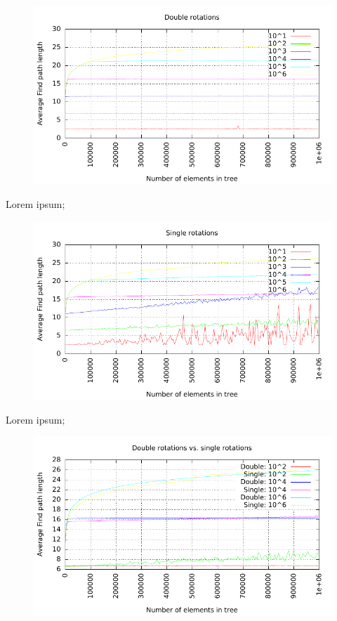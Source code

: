 \documentclass[12pt,a4paper]{report}
\begin{document}
	
	\begin{figure}[h]	
		\centering	
		\includegraphics[scale=0.75]{graph_1}		
	\end{figure}

Lorem ipsum;

	\begin{figure}[h]	
		\centering	
		\includegraphics[scale=0.75]{graph_2}		
	\end{figure}

Lorem ipsum;

	\begin{figure}[h]	
		\centering	
		\includegraphics[scale=0.75]{graph_3}		
	\end{figure}
\end{document}

